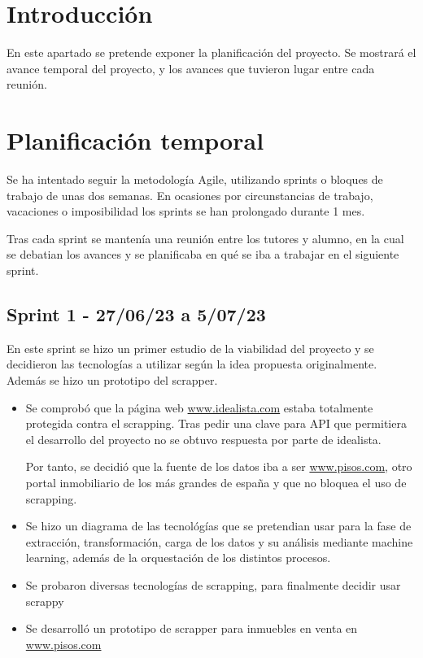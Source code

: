 
\section{Introducción}

En este apartado se pretende exponer la planificación del proyecto. Se mostrará el avance temporal del proyecto, y los avances que tuvieron lugar entre cada reunión.

\section{Planificación temporal}

Se ha intentado seguir la metodología Agile, utilizando sprints o bloques de trabajo de unas dos semanas. En ocasiones por circunstancias de trabajo, vacaciones o imposibilidad los sprints se han prolongado durante 1 mes.

Tras cada sprint se mantenía una reunión entre los tutores y alumno, en la cual se debatian los avances y se planificaba en qué se iba a trabajar en el siguiente sprint.

\subsection{Sprint 1 - 27/06/23 a 5/07/23}

En este sprint se hizo un primer estudio de la viabilidad del proyecto y se decidieron las tecnologías a utilizar según la idea propuesta originalmente. Además se hizo un prototipo del scrapper.

\begin{itemize}
    \item Se comprobó que la página web \url{www.idealista.com} estaba totalmente protegida contra el scrapping. Tras pedir una clave para API que permitiera el desarrollo del proyecto no se obtuvo respuesta por parte de idealista.

    Por tanto, se decidió que la fuente de los datos iba a ser \url{www.pisos.com}, otro portal inmobiliario de los más grandes de españa y que no bloquea el uso de scrapping.
    \item Se hizo un diagrama de las tecnológías que se pretendian usar para la fase de extracción, transformación, carga de los datos y su análisis mediante machine learning, además de la orquestación de los distintos procesos.
    \item Se probaron diversas tecnologías de scrapping, para finalmente decidir usar scrappy
    \item Se desarrolló un prototipo de scrapper para inmuebles en venta en \url{www.pisos.com}
\end{itemize}

